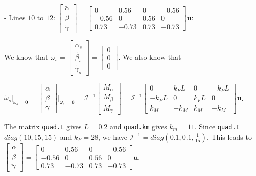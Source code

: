 \documentclass[a4paper]{report}
\begin{document}
- Lines $10$ to $12$: $\begin{bmatrix} \ddot{\alpha} \\ \ddot{\beta} \\ \ddot{\gamma} \end{bmatrix} = \begin{bmatrix} 0 & 0.56 & 0 & -0.56 \\ -0.56 & 0 & 0.56 & 0 \\ 0.73 & -0.73 & 0.73 & -0.73 \end{bmatrix} \bm{u}$:\par
We know that $\omega_s = \begin{bmatrix} \dot{\alpha_s} \\ \dot{\beta_s} \\ \dot{\gamma_s} \end{bmatrix} = \begin{bmatrix} 0 \\ 0 \\ 0 \end{bmatrix}$. We also know that \par 
$\dot{\omega}_s |_{\omega_s = \bm{0}} = \begin{bmatrix} \ddot{\alpha} \\ \ddot{\beta} \\ \ddot{\gamma} \end{bmatrix} \Big |_{\omega_s = \bm{0}} = \mathcal{I}^{-1} \begin{bmatrix} M_\alpha \\ M_\beta \\ M_\gamma \end{bmatrix} = \mathcal{I}^{-1} \begin{bmatrix} 0 & k_F L & 0 & - k_F L \\ -k_F L & 0 & k_F L & 0 \\ k_M & -k_M & k_M & -k_M \end{bmatrix} \bm{u}$. \par
The matrix \texttt{quad.L} gives $L = 0.2$ and \texttt{quad.km} gives $k_m = 11$. Since \texttt{quad.I} = $diag(10, 15, 15)$ and $k_F = 28$, we have $\mathcal{I}^{-1} = diag(0.1, 0.1, \frac{1}{15})$. This leads to $\begin{bmatrix} \ddot{\alpha} \\ \ddot{\beta} \\ \ddot{\gamma} \end{bmatrix} = \begin{bmatrix} 0 & 0.56 & 0 & -0.56 \\ -0.56 & 0 & 0.56 & 0 \\ 0.73 & -0.73 & 0.73 & -0.73 \end{bmatrix} \bm{u} $.
\end{document}
